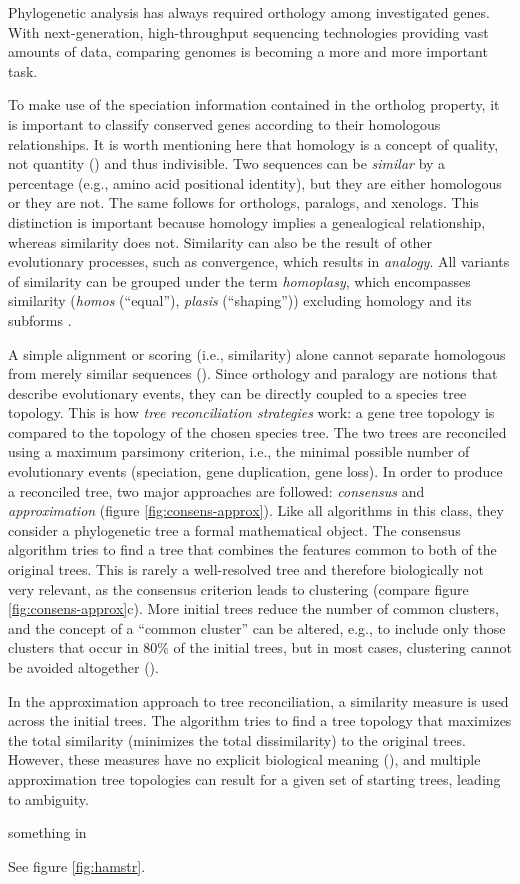 Phylogenetic analysis has always required orthology among investigated genes.
With next-generation, high-throughput sequencing technologies providing vast
amounts of data, comparing genomes is becoming a more and more important task. 

To make use of the speciation information contained in the ortholog property, it
is important to classify conserved genes according to their homologous
relationships. It is worth mentioning here that homology is a concept of
quality, not quantity (\cite{reeck1987}) and thus indivisible. Two sequences can
be \emph{similar} by a percentage (e.g., amino acid positional identity), but
they are either homologous or they are not. The same follows for orthologs,
paralogs, and xenologs. This distinction is important because homology implies a
genealogical relationship, whereas similarity does not. Similarity can also be
the result of other evolutionary processes, such as convergence, which results
in \emph{analogy}. All variants of similarity can be grouped under the term
\emph{homoplasy}, which encompasses similarity (\emph{homos} (``equal''),
\emph{plasis} (``shaping'')) excluding homology and its subforms \cite{page1998}.

A simple alignment or scoring (i.e., similarity) alone cannot separate
homologous from merely similar sequences (\cite{eisen1998}). Since orthology and
paralogy are notions that describe evolutionary events, they can be directly
coupled to a species tree topology. This is how \emph{tree reconciliation
strategies} work: a gene tree topology is compared to the topology of the chosen
species tree. The two trees are reconciled using a maximum parsimony criterion,
i.e., the minimal possible number of evolutionary events (speciation, gene
duplication, gene loss). In order to produce a reconciled tree, two major
approaches are followed: \emph{consensus} and \emph{approximation} (figure
\ref{fig:consens-approx}). Like all algorithms in this class, they consider a
phylogenetic tree a formal mathematical object. The consensus algorithm tries to
find a tree that combines the features common to both of the original trees.
This is rarely a well-resolved tree and therefore biologically not very
relevant, as the consensus criterion leads to clustering (compare figure
\ref{fig:consens-approx}c). More initial trees reduce the number of common
clusters, and the concept of a ``common cluster'' can be altered, e.g., to
include only those clusters that occur in 80\% of the initial trees, but in most
cases, clustering cannot be avoided altogether (\cite{mirkin1995}).

In the approximation approach to tree reconciliation, a similarity measure is
used across the initial trees. The algorithm tries to find a tree topology that
maximizes the total similarity (minimizes the total dissimilarity) to the
original trees. However, these measures have no explicit biological meaning
(\cite{mirkin1995}), and multiple approximation tree topologies can result for a
given set of starting trees, leading to ambiguity.

something in \cite{page1997}



See figure \ref{fig:hamstr}.
